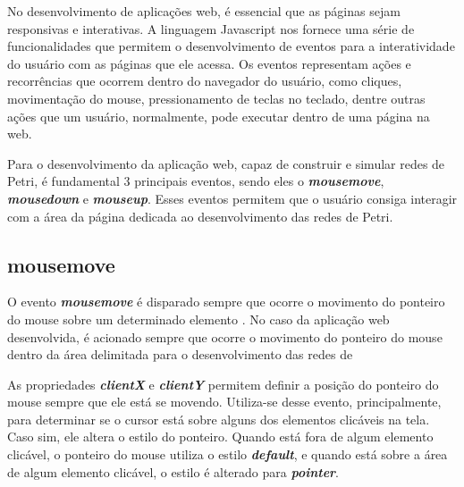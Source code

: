 \documentclass[
	12pt,				%
	openright,			%
	oneside,			%
	a4paper,			%
	english,			%
	brazil				%
	]{abntex2}
\theoremstyle{doispontos}
\begin{document}
No desenvolvimento de aplicações web, é essencial que as páginas sejam responsivas e interativas. A linguagem Javascript nos fornece uma série de funcionalidades que permitem o desenvolvimento de eventos para a interatividade do usuário com as páginas que ele acessa. Os eventos representam ações e recorrências que ocorrem dentro do navegador do usuário, como cliques, movimentação do mouse, pressionamento de teclas no teclado, dentre outras ações que um usuário, normalmente, pode executar dentro de uma página na web. 

Para o desenvolvimento da aplicação web, capaz de construir e simular redes de Petri, é fundamental 3 principais eventos, sendo eles o \textbf{\textit{mousemove}}, \textbf{\textit{mousedown}} e \textbf{\textit{mouseup}}. Esses eventos permitem que o usuário consiga interagir com a área da página dedicada ao desenvolvimento das redes de Petri. 

\subsection{mousemove}\label{cap:mousemove}

O evento \textbf{\textit{mousemove}} é disparado sempre que ocorre o movimento do ponteiro do mouse sobre um determinado elemento \textcite{mdn_mousemove_event}. No caso da aplicação web desenvolvida, é acionado sempre que ocorre o movimento do ponteiro do mouse dentro da área delimitada para o desenvolvimento das redes de 



As propriedades \textbf{\textit{clientX}} e \textbf{\textit{clientY}} permitem definir a posição do ponteiro do mouse sempre que ele está se movendo. Utiliza-se desse evento, principalmente, para determinar se o cursor está sobre alguns dos elementos clicáveis na tela. Caso sim, ele altera o estilo do ponteiro. Quando está fora de algum elemento clicável, o ponteiro do mouse utiliza o estilo \textbf{\textit{default}}, e quando está sobre a área de algum elemento clicável, o estilo é alterado para \textbf{\textit{pointer}}.
\end{document}

